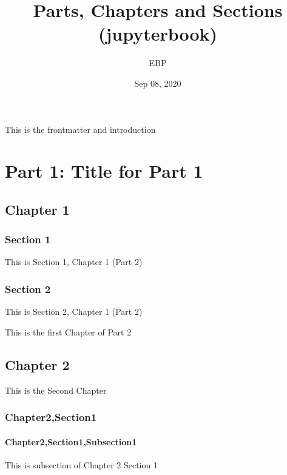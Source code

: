 \documentclass[letterpaper,10pt,english]{sphinxmanual}
\title{Parts, Chapters and Sections (jupyterbook)}
\date{Sep 08, 2020}
\author{EBP}
\begin{document}
\pagestyle{empty}
\sphinxmaketitle
\pagestyle{plain}
\sphinxtableofcontents
\pagestyle{normal}
\label{\detokenize{intro::doc}}


This is the frontmatter and introduction


\chapter{Part 1: Title for Part 1}
\label{\detokenize{part1:part-1-title-for-part-1}}\label{\detokenize{part1::doc}}

\section{Chapter 1}
\label{\detokenize{chapter1:chapter-1}}\label{\detokenize{chapter1::doc}}

\subsection{Section 1}
\label{\detokenize{chapter1-section1:section-1}}\label{\detokenize{chapter1-section1::doc}}
This is Section 1, Chapter 1 (Part 2)


\subsection{Section 2}
\label{\detokenize{chapter1-section2:section-2}}\label{\detokenize{chapter1-section2::doc}}
This is Section 2, Chapter 1 (Part 2)

This is the first Chapter of Part 2


\section{Chapter 2}
\label{\detokenize{chapter2:chapter-2}}\label{\detokenize{chapter2::doc}}
This is the Second Chapter


\subsection{Chapter2,Section1}
\label{\detokenize{chapter2:chapter2-section1}}

\subsubsection{Chapter2,Section1,Subsection1}
\label{\detokenize{chapter2:chapter2-section1-subsection1}}
This is subsection of Chapter 2 Section 1
\end{document}
